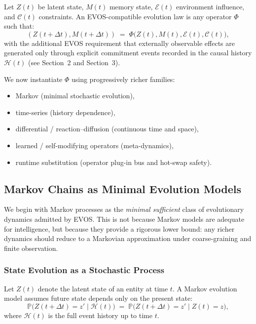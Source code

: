 \documentclass[11pt]{article}
\begin{document}
Let $Z(t)$ be latent state, $M(t)$ memory state, $\mathcal{E}(t)$ environment influence,
and $\mathcal{C}(t)$ constraints. An EVOS-compatible evolution law is any operator
$\Phi$ such that:
\[
(Z(t+\Delta t), M(t+\Delta t)) \;=\; \Phi\!\big(Z(t), M(t), \mathcal{E}(t), \mathcal{C}(t)\big),
\]
with the additional EVOS requirement that externally observable effects are generated only
through explicit commitment events recorded in the causal history $\mathcal{H}(t)$
(see Section~2 and Section~3).

We now instantiate $\Phi$ using progressively richer families:
\begin{itemize}
  \item Markov (minimal stochastic evolution),
  \item time-series (history dependence),
  \item differential / reaction--diffusion (continuous time and space),
  \item learned / self-modifying operators (meta-dynamics),
  \item runtime substitution (operator plug-in bus and hot-swap safety).
\end{itemize}

\vspace{3mm}

\subsection{Markov Chains as Minimal Evolution Models}
\label{sec:markov-minimal}

We begin with Markov processes as the \emph{minimal sufficient} class of evolutionary
dynamics admitted by EVOS. This is not because Markov models are adequate for
intelligence, but because they provide a rigorous lower bound: any richer dynamics should
reduce to a Markovian approximation under coarse-graining and finite observation.

\subsubsection{State Evolution as a Stochastic Process}

Let $Z(t)$ denote the latent state of an entity at time $t$. A Markov evolution model
assumes future state depends only on the present state:
\[
\mathbb{P}\!\big(Z(t+\Delta t)=z' \mid \mathcal{H}(t)\big)
\;=\;
\mathbb{P}\!\big(Z(t+\Delta t)=z' \mid Z(t)=z\big),
\]
where $\mathcal{H}(t)$ is the full event history up to time $t$.
\end{document}
